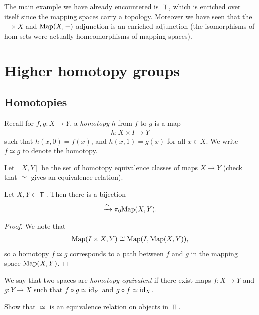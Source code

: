 \documentclass{article}[11pt]
\begin{document}
\begin{example}
The main example we have already encountered is $\Top$, which is enriched over itself since the mapping spaces carry a topology. Moreover we have seen that the $-\times X$ and $\textup{Map}(X, -)$ adjunction is an enriched adjunction (the isomorphisms of hom sets were actually homeomorphisms of mapping spaces).
\end{example}


\section{Higher homotopy groups}
\subsection{Homotopies}
Recall for $f,g : X \to Y$, a \textit{homotopy} $h$ from $f$ to $g$ is a map
\begin{align*}
	h : X\times I \to Y
\end{align*}
such that $h(x,0) = f(x)$, and $h(x,1) = g(x)$ for all $x\in X$. We write $f\simeq g$ to denote the homotopy.

\begin{definition} Let $[X,Y]$ be the set of homotopy equivalence classes of maps $X\to Y$ (check that $\simeq$ gives an equivalence relation).
\end{definition}

\begin{proposition} Let $X,Y \in \Top$. Then there is a bijection
\begin{align*}
	[X,Y] \xto{\cong} \pi_0 \Map(X,Y).
\end{align*}
\end{proposition}
\begin{proof} We note that
\begin{align*}
	\textup{Map}(I\times X, Y) \cong \textup{Map}(I, \textup{Map}(X,Y)),
\end{align*}
so a homotopy $f\simeq g$ corresponds to a path between $f$ and $g$ in the mapping space $\textup{Map}(X,Y)$.
\end{proof}

\begin{definition} We say that two spaces are \textit{homotopy equivalent} if there exist maps $f: X \to Y$ and $g : Y \to X$ such that $f\circ g\simeq \text{id}_Y$ and $g\circ f \simeq \text{id}_X$.
\end{definition}

\begin{exercise} Show that $\simeq$ is an equivalence relation on objects in $\Top$.
\end{exercise}
\end{document}
